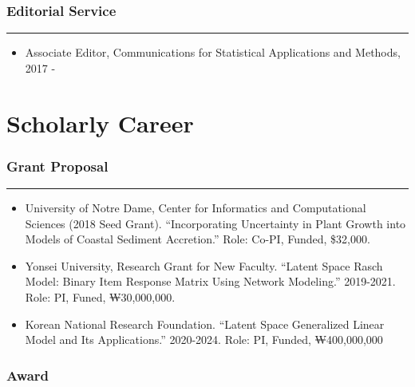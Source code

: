 \documentclass[
]{book}
\providecommand{\tightlist}{%
  \setlength{\itemsep}{0pt}\setlength{\parskip}{0pt}}
\begin{document}
\hypertarget{editorial-service}{%
\subsubsection*{Editorial Service}\label{editorial-service}}

\begin{center}\rule{0.5\linewidth}{0.5pt}\end{center}

\begin{itemize}
\tightlist
\item
  Associate Editor, Communications for Statistical Applications and Methods, 2017 -
\end{itemize}

\hypertarget{scholarly-career}{%
\section*{Scholarly Career}\label{scholarly-career}}

\hypertarget{grant-proposal}{%
\subsubsection*{Grant Proposal}\label{grant-proposal}}

\begin{center}\rule{0.5\linewidth}{0.5pt}\end{center}

\begin{itemize}
\item
  University of Notre Dame, Center for Informatics and Computational Sciences (2018 Seed Grant). ``Incorporating Uncertainty in Plant Growth into Models of Coastal Sediment Accretion.'' Role: Co-PI, Funded, \$32,000.
\item
  Yonsei University, Research Grant for New Faculty. ``Latent Space Rasch Model: Binary Item Response Matrix Using Network Modeling.'' 2019-2021. Role: PI, Funed, ₩30,000,000.
\item
  Korean National Research Foundation. ``Latent Space Generalized Linear Model and Its Applications.'' 2020-2024. Role: PI, Funded, ₩400,000,000
\end{itemize}

\hypertarget{award}{%
\subsubsection*{Award}\label{award}}
\end{document}
